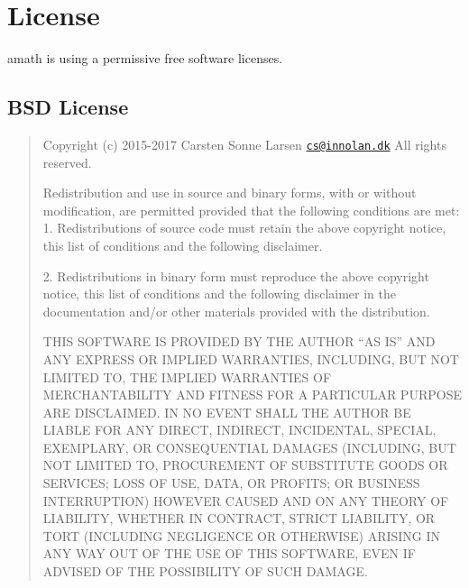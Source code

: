 \hypertarget{license_page_license_sec}{}\section{License}\label{license_page_license_sec}
amath is using a permissive free software licenses.\hypertarget{license_page_license_bsd}{}\subsection{B\+S\+D License}\label{license_page_license_bsd}
\begin{quote}

\begin{DoxyPre}
Copyright (c) 2015-2017 Carsten Sonne Larsen  \href{mailto:cs@innolan.dk}{\tt cs@innolan.dk}
All rights reserved.\end{DoxyPre}



\begin{DoxyPre}Redistribution and use in source and binary forms, with or without
modification, are permitted provided that the following conditions
are met:
1. Redistributions of source code must retain the above copyright
   notice, this list of conditions and the following disclaimer.\end{DoxyPre}



\begin{DoxyPre}2. Redistributions in binary form must reproduce the above copyright
   notice, this list of conditions and the following disclaimer in the
   documentation and/or other materials provided with the distribution.\end{DoxyPre}



\begin{DoxyPre}THIS SOFTWARE IS PROVIDED BY THE AUTHOR ``AS IS'' AND ANY EXPRESS OR
IMPLIED WARRANTIES, INCLUDING, BUT NOT LIMITED TO, THE IMPLIED WARRANTIES
OF MERCHANTABILITY AND FITNESS FOR A PARTICULAR PURPOSE ARE DISCLAIMED.
IN NO EVENT SHALL THE AUTHOR BE LIABLE FOR ANY DIRECT, INDIRECT,
INCIDENTAL, SPECIAL, EXEMPLARY, OR CONSEQUENTIAL DAMAGES (INCLUDING, BUT
NOT LIMITED TO, PROCUREMENT OF SUBSTITUTE GOODS OR SERVICES; LOSS OF USE,
DATA, OR PROFITS; OR BUSINESS INTERRUPTION) HOWEVER CAUSED AND ON ANY
THEORY OF LIABILITY, WHETHER IN CONTRACT, STRICT LIABILITY, OR TORT
(INCLUDING NEGLIGENCE OR OTHERWISE) ARISING IN ANY WAY OUT OF THE USE OF
THIS SOFTWARE, EVEN IF ADVISED OF THE POSSIBILITY OF SUCH DAMAGE.
\end{DoxyPre}
\end{quote}
